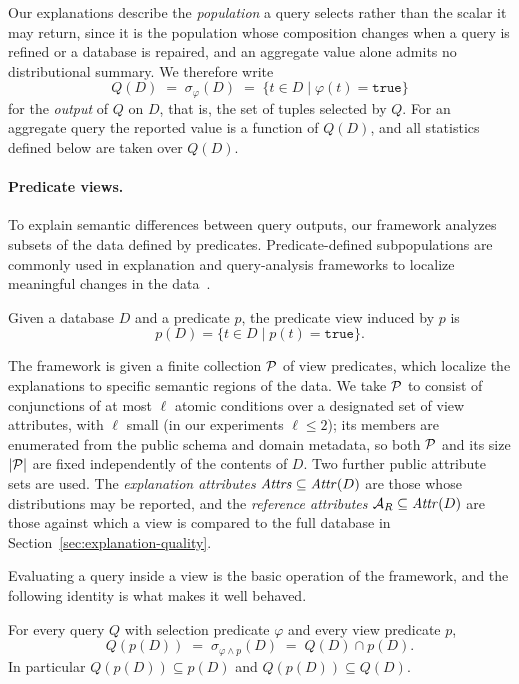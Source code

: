 Our explanations describe the \emph{population} a query selects rather than the
scalar it may return, since it is the population whose composition changes when a
query is refined or a database is repaired, and an aggregate value alone admits no
distributional summary.
We therefore write
\[
Q(D) \;=\; \sigma_{\varphi}(D) \;=\; \{t \in D \mid \varphi(t)=\texttt{true}\}
\]
for the \emph{output} of $Q$ on $D$, that is, the set of tuples selected by $Q$.
For an aggregate query the reported value is a function of $Q(D)$, and all
statistics defined below are taken over $Q(D)$.

\paragraph{Predicate views.}
To explain semantic differences between query outputs, our framework analyzes
subsets of the data defined by predicates.
Predicate-defined subpopulations are commonly used in explanation and
query-analysis frameworks to localize meaningful changes in the
data~\cite{FEDEX,TaoGMR22,wu2013}.

\begin{definition}
\label{def:predicate-view}
Given a database $D$ and a predicate $p$, the predicate view induced by $p$ is
\[
p(D)=\{t\in D \mid p(t)=\texttt{true}\}.
\]
\end{definition}

The framework is given a finite collection $\mathcal{P}$ of view predicates, which
localize the explanations to specific semantic regions of the data.
We take $\mathcal{P}$ to consist of conjunctions of at most $\ell$ atomic conditions over
a designated set of view attributes, with $\ell$ small (in our experiments
$\ell\le 2$); its members are enumerated from the public schema and domain
metadata, so both $\mathcal{P}$ and its size $|\mathcal{P}|$ are fixed independently of the
contents of $D$.
Two further public attribute sets are used.
The \emph{explanation attributes} $\mathit{Attrs}\subseteq\mathit{Attr}(D)$ are those whose
distributions may be reported, and the \emph{reference attributes}
$\mathcal{A}_R\subseteq\mathit{Attr}(D)$ are those against which a view is compared to the
full database in Section~\ref{sec:explanation-quality}.

Evaluating a query inside a view is the basic operation of the framework, and the
following identity is what makes it well behaved.

\begin{proposition}
\label{prop:view-restriction}
For every query $Q$ with selection predicate $\varphi$ and every view predicate $p$,
\[
Q(p(D)) \;=\; \sigma_{\varphi\wedge p}(D) \;=\; Q(D)\cap p(D).
\]
In particular $Q(p(D)) \subseteq p(D)$ and $Q(p(D)) \subseteq Q(D)$.
\end{proposition}

